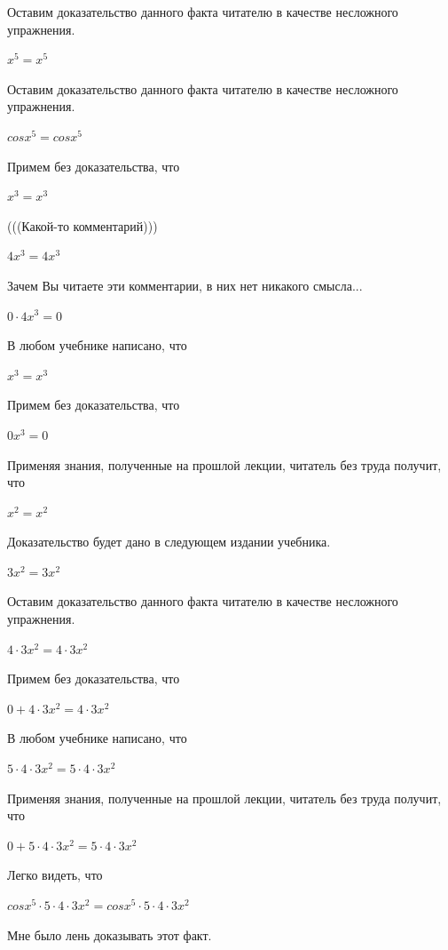 \documentclass[12pt,a4paper,fleqn]{article}
\theoremstyle{definition}
\begin{document}
Оставим доказательство данного факта читателю в качестве несложного упражнения. 

${ x }^{ 5 } = { x }^{ 5 }$

Оставим доказательство данного факта читателю в качестве несложного упражнения. 

$cos{ x }^{ 5 } = cos{ x }^{ 5 }$

Примем без доказательства, что 

${ x }^{ 3 } = { x }^{ 3 }$

(((Какой-то комментарий))) 

$ 4 { x }^{ 3 } =  4 { x }^{ 3 }$

Зачем Вы читаете эти комментарии, в них нет никакого смысла... 

$ 0  \cdot  4 { x }^{ 3 } =  0 $

В любом учебнике написано, что 

${ x }^{ 3 } = { x }^{ 3 }$

Примем без доказательства, что 

$ 0 { x }^{ 3 } =  0 $

Применяя знания, полученные на прошлой лекции, читатель без труда получит, что 

${ x }^{ 2 } = { x }^{ 2 }$

Доказательство будет дано в следующем издании учебника. 

$ 3 { x }^{ 2 } =  3 { x }^{ 2 }$

Оставим доказательство данного факта читателю в качестве несложного упражнения. 

$ 4  \cdot  3 { x }^{ 2 } =  4  \cdot  3 { x }^{ 2 }$

Примем без доказательства, что 

$ 0  +  4  \cdot  3 { x }^{ 2 } =  4  \cdot  3 { x }^{ 2 }$

В любом учебнике написано, что 

$ 5  \cdot  4  \cdot  3 { x }^{ 2 } =  5  \cdot  4  \cdot  3 { x }^{ 2 }$

Применяя знания, полученные на прошлой лекции, читатель без труда получит, что 

$ 0  +  5  \cdot  4  \cdot  3 { x }^{ 2 } =  5  \cdot  4  \cdot  3 { x }^{ 2 }$

Легко видеть, что 

$cos{ x }^{ 5 } \cdot  5  \cdot  4  \cdot  3 { x }^{ 2 } = cos{ x }^{ 5 } \cdot  5  \cdot  4  \cdot  3 { x }^{ 2 }$

Мне было лень доказывать этот факт.
\end{document}
